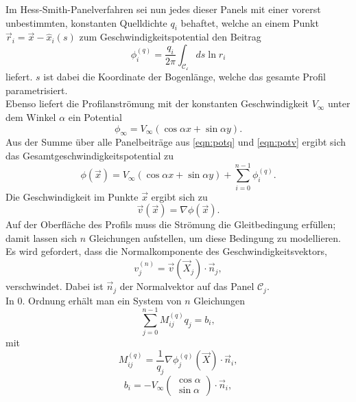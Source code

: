 Im Hess-Smith-Panelverfahren sei nun jedes dieser Panels mit einer vorerst unbestimmten, konstanten Quelldichte $q_i$ behaftet, welche an einem Punkt $\vec r_i =  \vec x - \hat x_i(s)$ zum Geschwindigkeitspotential den Beitrag
\begin{equation}
\label{eqn:potq}
\phi_i^{(q)} =  \frac{q_i}{2 \pi } \int_{\mathcal{C_i}} ds \ln r_i
\end{equation}
liefert. $s$ ist dabei die Koordinate der Bogenlänge, welche das gesamte Profil parametrisiert. \\
Ebenso liefert die Profilanströmung mit der konstanten Geschwindigkeit $V_{\infty}$ unter dem Winkel $\alpha $ ein Potential
\begin{equation}
\label{eqn:potv}
\phi_{\infty} =  V_{\infty} (\cos \alpha x + \sin \alpha y).
\end{equation}
Aus der Summe über alle Panelbeiträge aus \eqref{eqn:potq} und \eqref{eqn:potv} ergibt sich das Gesamtgeschwindigkeitspotential zu
\begin{equation}
\label{eqn:potnovortex}
\phi(\vec x) =  V_{\infty} (\cos \alpha x + \sin \alpha y) + \sum_{i=0}^{n-1} \phi_i^{(q)}.
\end{equation}
Die Geschwindigkeit im Punkte $\vec x$  ergibt sich zu
\begin{equation}
\vec v ( \vec x) =  \nabla  \phi (\vec x).
\end{equation}
Auf der Oberfläche des Profils muss die Strömung die Gleitbedingung erfüllen; damit lassen sich $n$ Gleichungen aufstellen, um diese Bedingung zu modellieren. Es wird gefordert, dass die Normalkomponente des Geschwindigkeitsvektors,
\begin{equation}
v_j^{(n)} =  \vec v(\vec X_j) \cdot \vec n_j,
\end{equation}
verschwindet. Dabei ist $\vec n_j$ der Normalvektor auf das Panel $\mathcal{C}_j$.\\
In 0. Ordnung erhält man ein System von $n$ Gleichungen
\begin{equation}
\label{eq:lgls1}
\sum_{j=0}^{n-1} M_{ij}^{(q)}q_j =  b_i,
\end{equation}
mit
\begin{equation}
M_{ij}^{(q)} = \frac{1}{q_j} \nabla \phi_j^{(q)} (\vec X) \cdot \vec n_i,
\end{equation}
\begin{equation}
b_i =  -V_{\infty} \left( \begin{matrix} \cos \alpha \\ \sin \alpha \end{matrix} \right) \cdot \vec n_i,
\end{equation}
